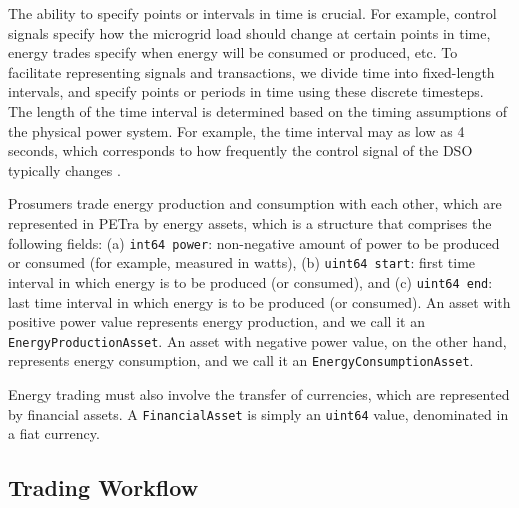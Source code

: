 The ability to specify points or intervals in time is crucial.  For
example, control signals specify how the microgrid load should change
at certain points in time, energy trades specify when energy will be
consumed or produced, etc.  To facilitate representing signals and
transactions, we divide time into fixed-length intervals, and specify
points or periods in time using these discrete timesteps.  The length
of the time interval is determined based on the timing assumptions of
the physical power system.  For example, the
time interval may as low as 4 seconds, which corresponds to how frequently
the control signal of the DSO typically changes \cite{federal2011frequency}.

Prosumers trade energy production and consumption with each other, which are represented in PETra by energy assets, which is a structure that comprises the following fields: (a)
 \texttt{int64 power}: non-negative amount of power to be produced or consumed (for example, measured in watts), (b)
 \texttt{uint64 start}: first time interval in which energy is to be produced (or consumed), and (c) \texttt{uint64 end}: last time interval in which energy is to be produced (or consumed).
An asset with positive power value represents energy production, and we call it an \texttt{EnergyProductionAsset}.
An asset with negative power value, on the other hand, represents energy consumption, and we call it an \texttt{EnergyConsumptionAsset}.

Energy trading must also involve the transfer of currencies, which are represented by financial assets.
A \texttt{FinancialAsset} is simply an \texttt{uint64} value, denominated in a fiat currency.


\subsection{Trading Workflow}

